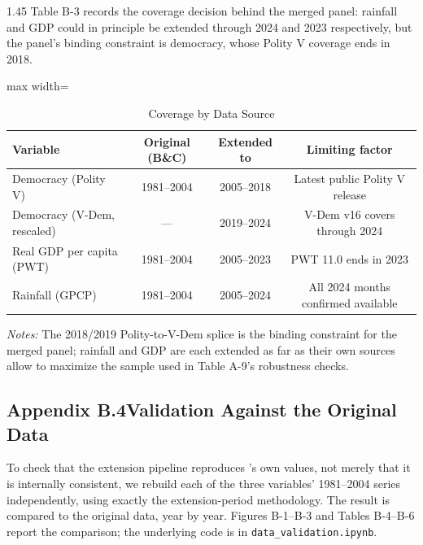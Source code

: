 \documentclass[12pt]{article}
\begin{document}
\begin{bibunit}[jpe]
\begin{spacing}{1.45}
Table B-3 records the coverage decision behind the merged panel: rainfall and GDP could in principle be extended through 2024 and 2023 respectively, but the panel's binding constraint is democracy, whose Polity V coverage ends in 2018.

\begin{table}[H]
\centering
\begin{adjustbox}{max width=\textwidth}
\begin{threeparttable}
\caption{Coverage by Data Source}
\label{tab:B3}
\begin{tabular}{lccc}
\toprule
Variable & Original (B\&C) & Extended to & Limiting factor \\
\midrule
Democracy (Polity V) & 1981--2004 & 2005--2018 & Latest public Polity V release \\
Democracy (V-Dem, rescaled) & --- & 2019--2024 & V-Dem v16 covers through 2024 \\
Real GDP per capita (PWT) & 1981--2004 & 2005--2023 & PWT 11.0 ends in 2023 \\
Rainfall (GPCP) & 1981--2004 & 2005--2024 & All 2024 months confirmed available \\
\bottomrule
\end{tabular}
\begin{tablenotes}[flushleft]
\footnotesize
\item \textit{Notes:} The 2018/2019 Polity-to-V-Dem splice is the binding constraint for the merged panel; rainfall and GDP are each extended as far as their own sources allow to maximize the sample used in Table A-9's robustness checks.
\end{tablenotes}
\end{threeparttable}
\end{adjustbox}
\end{table}

\subsection*{Appendix B.4\quad Validation Against the Original Data}

To check that the extension pipeline reproduces \citeauthor{bruckner2011rain}'s own values, not merely that it is internally consistent, we rebuild each of the three variables' 1981--2004 series independently, using exactly the extension-period methodology. The result is compared to the original data, year by year. Figures B-1--B-3 and Tables B-4--B-6 report the comparison; the underlying code is in \texttt{data\_validation.ipynb}.


\end{spacing}
\end{bibunit}
\end{document}
